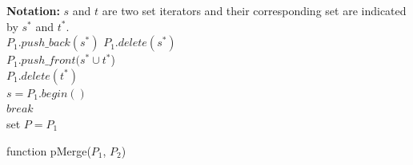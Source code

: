 \documentclass[11pt]{article}
\begin{document}
\begin{algorithm}[H]
\textbf{Notation:} $s$ and $t$ are two set iterators and their corresponding set are indicated by $s^*$ and $t^*$.\\ 
\nl {}
{
\nl $P_1.push\_back(s^*)$
}
\nl {}
{
\nl {}
{
 \nl {}
  {
\nl   $P_1.delete(s^*)$\\
\nl	$  P_1.push\_front(s^*\cup t^*$)\\
  \nl $P_1.delete(t^*)$\\
  \nl $s=P_1.begin()$\\
   \nl$break$\\
  }
}
}
\nl set $P=P_1$\\
\caption{function pMerge($P_1$, $P_2$)}
\end{algorithm}
\end{document}
